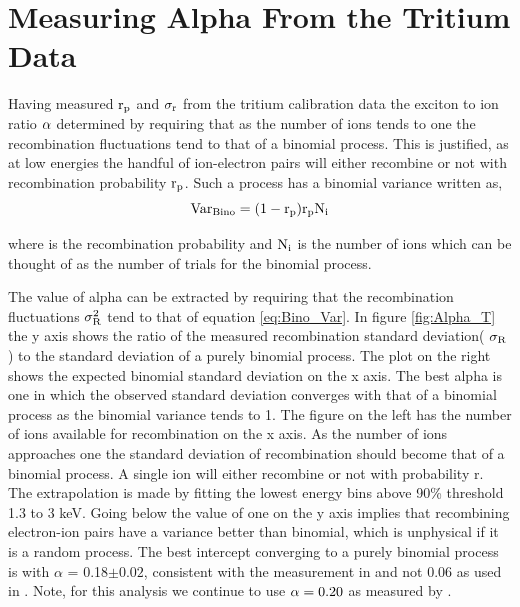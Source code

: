 \newpage

\section{Measuring Alpha From the Tritium Data}

Having measured $\rm r_p$ and $\rm \sigma_r$ from the tritium calibration data the exciton to ion ratio $\rm \alpha$ determined by requiring that as the number of ions tends to one the recombination fluctuations tend to that of a binomial process. This is justified, as at low energies the handful of ion-electron pairs will either recombine or not with recombination probability $\rm r_p$. Such a process has a binomial variance written as,
\begin{equation}
\rm Var_{Bino}= (1-r_p)r_p N_i
\label{eq:Bino_Var}
\end{equation}

\noindent where \rp is the recombination probability and $\rm N_i$ is the number of ions which can be thought of as the number of trials for the binomial process. 

The value of alpha can be extracted by requiring that the recombination fluctuations $\rm \sigma_R^2$ tend to that of equation \ref{eq:Bino_Var}. In figure \ref{fig:Alpha_T} the y axis shows the ratio of the measured recombination standard deviation( $\rm \sigma_R$) to the standard deviation of a purely binomial process. The plot on the right shows the expected binomial standard deviation on the x axis. The best alpha is one in which the observed standard deviation converges with that of a binomial process as the binomial variance tends to 1. The figure on the left has the number of ions available for recombination on the x axis. As the number of ions approaches one the standard deviation of recombination should become that of a binomial process. A single ion will either recombine or not with probability r.  The extrapolation is made by fitting the lowest energy bins above 90\% threshold 1.3 to 3 keV. Going below the value of one on the y axis implies that recombining electron-ion pairs have a variance better than binomial, which is unphysical if it is a random process. The best intercept converging to a purely binomial process is with $\alpha$ = 0.18$\pm 0.02$, consistent with the measurement in \cite{Doke_alpha} and not 0.06 as used in \cite{Dahl_Thesis}. Note, for this analysis we continue to use $\rm \alpha = 0.20$ as measured by \cite{Doke_alpha}.

